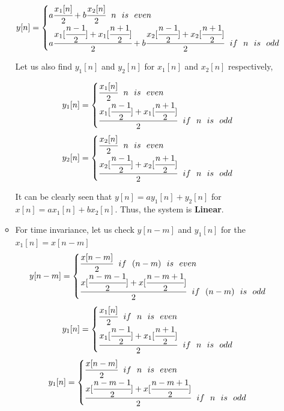 \documentclass[a4paper,12pt]{article}
\begin{document}
\begin{enumerate}
\begin{itemize}
     		$$  y[n] = 
     		\begin{cases}
     			a\cfrac{x_1[n]}{2}+b\cfrac{x_2[n]}{2} ~~ n~~is~~even \\
     			
     			a\cfrac{x_1[\cfrac{n-1}{2}]+x_1[\cfrac{n+1}{2}]}{2}+b\cfrac{x_2[\cfrac{n-1}{2}]+x_2[\cfrac{n+1}{2}]}{2} ~~ if ~~ n~~is~~odd\\
     		\end{cases}	$$

		Let us also find $y_1[n]$ and $y_2[n]$ for $x_1[n]$ and $x_2[n]$ respectively,
		
			$$  y_1[n] = 
     		\begin{cases}
     			\cfrac{x_1[n]}{2} ~~ n~~is~~even \\
     			
     			\cfrac{x_1[\cfrac{n-1}{2}]+x_1[\cfrac{n+1}{2}]}{2}~~ if ~~ n~~is~~odd\\
     		\end{cases}	$$
     		$$  y_2[n] = 
     		\begin{cases}
     			\cfrac{x_2[n]}{2} ~~ n~~is~~even \\
     			
     			\cfrac{x_2[\cfrac{n-1}{2}]+x_2[\cfrac{n+1}{2}]}{2} ~~ if ~~ n~~is~~odd\\
     		\end{cases}	$$

		It can be clearly seen that $y[n]=ay_1[n]+y_2[n]$ for $x[n]=ax_1[n]+bx_2[n]$. Thus, the system is \textbf{Linear}.
		
			\item For time invariance, let us check $y[n-m]$ and $y_1[n]$ for the $x_1[n]=x[n-m]$
				$$  y[n-m] = 
     		\begin{cases}
     			\cfrac{x[n-m]}{2} ~~ if ~~ (n-m)~~is~~even \\
     			\cfrac{x[\cfrac{n-m-1}{2}]+x[\cfrac{n-m+1}{2}]}{2} ~~ if ~~ (n-m)~~is~~odd\\
     		\end{cases}	$$
     		$$  y_1[n] = 
     		\begin{cases}
     			\cfrac{x_1[n]}{2} ~~ if ~~ n~~is~~even \\
     			\cfrac{x_1[\cfrac{n-1}{2}]+x_1[\cfrac{n+1}{2}]}{2} ~~ if ~~ n~~is~~odd\\
     		\end{cases}	$$
     		$$  y_1[n] = 
     		\begin{cases}
     			\cfrac{x[n-m]}{2} ~~ if ~~ n~~is~~even \\
     			\cfrac{x[\cfrac{n-m-1}{2}]+x[\cfrac{n-m+1}{2}]}{2} ~~ if ~~ n~~is~~odd\\
     		\end{cases}	$$
     		

\end{itemize}
\end{enumerate}
\end{document}
